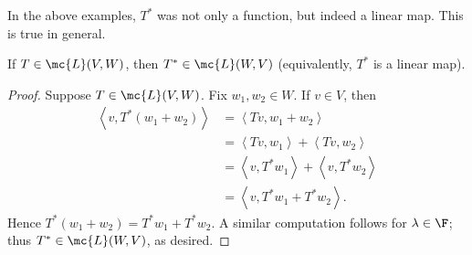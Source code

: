 \documentclass[math0540-lecture-notes.tex]{subfiles}
\begin{document}
In the above examples, $T^*$ was not only a function, but indeed a linear map. This is true in
general.
\begin{proposition}{}
  If $T\in \mc{L}(V,W)$, then $T^*\in \mc{L}(W,V)$ (equivalently, $T^*$ is a linear map).
\end{proposition}
\begin{proof}[Proof]
  Suppose $T\in \mc{L}(V,W)$. Fix $w_1,w_2\in W$. If $v\in V$, then
  \begin{align*}
    \left<v,T^*(w_1+w_2) \right>&= \left<Tv,w_1+w_2 \right>  \\
    &= \left<Tv,w_1 \right> +\left<Tv,w_2 \right>  \\
    &= \left<v,T^*w_1 \right> +\left<v,T^*w_2 \right>  \\
    &=\left<v,T^*w_1+T^*w_2 \right> 
  .\end{align*}
  Hence $T^*(w_1+w_2)=T^*w_1+T^*w_2$. A similar computation follows for $\lambda\in \F$; thus
  $T^*\in \mc{L}(W,V)$, as desired.
\end{proof}
\end{document}
